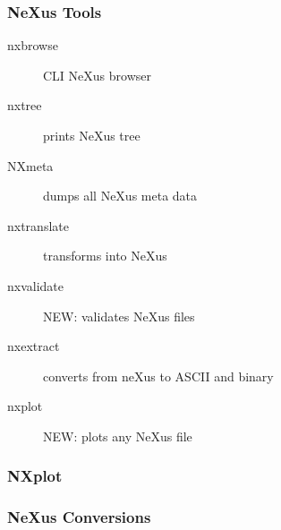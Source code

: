\documentclass{beamer}
\begin{document}
\begin{frame} \frametitle{NeXus Tools}
\begin{description}
\item[nxbrowse] CLI NeXus browser
\item[nxtree] prints NeXus tree
\item[NXmeta] dumps all NeXus meta data
\item[nxtranslate] transforms into NeXus 
\item[nxvalidate] {\color{red}NEW}: validates NeXus files 
\item[nxextract] converts from neXus to ASCII and binary
\item[nxplot] {\color{red}NEW}: plots any NeXus file
\end{description}
\end{frame}

\begin{frame} \frametitle{NXplot }
\begin{figure}[!ht]
\end{figure}
\end{frame}


\begin{frame} \frametitle{NeXus Conversions}
\begin{figure}[!ht]
\end{figure}
\end{frame}
\end{document}
